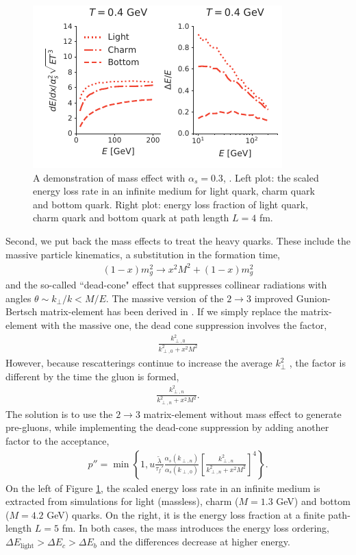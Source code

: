 \documentclass[aps, prc, reprint, amsmath, groupedaddress, nofootinbib]{revtex4-1}
\begin{document}
{\begin{figure}
\includegraphics[width=\columnwidth]{Eloss_mass.pdf}
\caption{A demonstration of mass effect with $\alpha_s=0.3$, . Left plot: the scaled energy loss rate in an infinite medium for light quark, charm quark and bottom quark. Right plot: energy loss fraction of light quark, charm quark and bottom quark at path length $L=4$ fm.  }
\label{fig:mass}
\end{figure}

Second, we put back the mass effects to treat the heavy quarks. These include the massive particle kinematics, a substitution in the formation time,
\begin{eqnarray}
(1-x)m_g^2 \rightarrow x^2M^2 + (1-x)m_g^2
\end{eqnarray}
and the so-called ``dead-cone" effect that suppresses collinear radiations with angles $\theta \sim k_\perp/k < M/E$. 
The massive version of the $2\rightarrow3$ improved Gunion-Bertsch matrix-element has been derived in \cite{Uphoff:2014hza}.
If we simply replace the matrix-element with the massive one, the dead cone suppression involves the factor,
\begin{eqnarray}
\frac{k_{\perp,0}^2}{k_{\perp,0}^2+x^2M^2}
\end{eqnarray}
However, because rescatterings continue to increase the average $k_{\perp}^2$ , the factor is different by the time the gluon is formed,
\begin{eqnarray}
\frac{k_{\perp,n}^2}{k_{\perp,n}^2+x^2M^2}.
\end{eqnarray}
The solution is to use the $2\rightarrow3$ matrix-element without mass effect to generate pre-gluons, while implementing the dead-cone suppression by adding another factor to the acceptance,
\begin{eqnarray}
p'' = \min\left\{1, u\frac{\tilde{\lambda}}{\tau_f'}\frac{\alpha_s(k_{\perp,n})}{\alpha_s(k_{\perp,0})} \left[\frac{k_{\perp,n}^2}{k_{\perp,n}^2+x^2 M^2}\right]^4\right\}.
\end{eqnarray}
On the left of Figure \ref{fig:mass}, the scaled energy loss rate in an infinite medium is extracted from simulations for light (massless), charm ($M=1.3$ GeV) and bottom ($M=4.2$ GeV) quarks. 
On the right, it is the energy loss fraction at a finite path-length $L=5$ fm.
In both cases, the mass introduces the energy loss ordering, $\Delta E_{\textrm{light}} > \Delta E_c > \Delta E_b$ and the differences decrease at higher energy.

}
\end{document}
